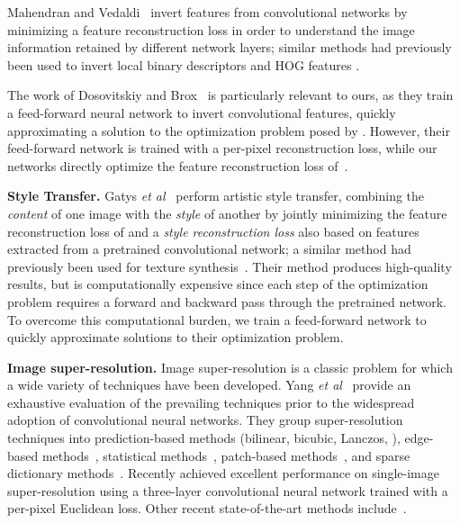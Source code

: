 \documentclass[runningheads]{llncs}
\newcommand{\etal}{\textit{et al}}
\begin{document}
Mahendran and Vedaldi~\cite{mahendran15understanding} invert features from convolutional
networks by minimizing a feature reconstruction loss in order to understand the image
information retained by different network layers; similar methods had previously been used
to invert local binary descriptors \cite{d2012beyond} and HOG features
\cite{vondrick2013hoggles}.

The work of Dosovitskiy and Brox~\cite{dosovitskiy2015inverting} is particularly relevant
to ours, as they train a feed-forward neural network to invert convolutional features, quickly
approximating a solution to the optimization problem posed by \cite{mahendran15understanding}.
However, their feed-forward network is trained with a per-pixel reconstruction loss, while
our networks directly optimize the feature reconstruction loss
of~\cite{mahendran15understanding}.

\textbf{Style Transfer.}
Gatys \etal~\cite{gatys2015neural} perform artistic style transfer, combining
the \emph{content} of one image with the \emph{style} of another by jointly minimizing the
feature reconstruction loss of \cite{mahendran15understanding} and a
\emph{style reconstruction loss} also based on features extracted from a pretrained
convolutional network; a similar method had previously been used for texture synthesis~\cite{Gatys2015b}.
Their method produces high-quality results, but is computationally
expensive since each step of the optimization problem requires a forward and backward pass
through the pretrained network. To overcome this computational burden, we train a feed-forward
network to quickly approximate solutions to their optimization problem.

\textbf{Image super-resolution.}
Image super-resolution is a classic problem for which a wide variety of techniques have
been developed. Yang \etal~\cite{yang2014single} provide an exhaustive evaluation of
the prevailing techniques prior to the widespread adoption of convolutional neural networks.
They group super-resolution techniques into prediction-based methods (bilinear, bicubic,
Lanczos, \cite{irani1991improving}), edge-based methods~\cite{freedman2011image,sun2008image},
statistical methods~\cite{shan2008fast,kim2010single,xiong2010robust}, patch-based
methods~\cite{freedman2011image,freeman2002example,chang2004super,glasner2009super,yang2013fast,sun2003image,ni2007image,he2013beta},
and sparse dictionary methods~\cite{yang2008image,yang2010image}.
Recently \cite{dong2015image} achieved excellent performance on single-image
super-resolution using a three-layer convolutional neural network trained with a per-pixel
Euclidean loss. Other recent state-of-the-art methods
include~\cite{timofte2014adjusted,schulter2015fast,huang2015single}.
\end{document}
